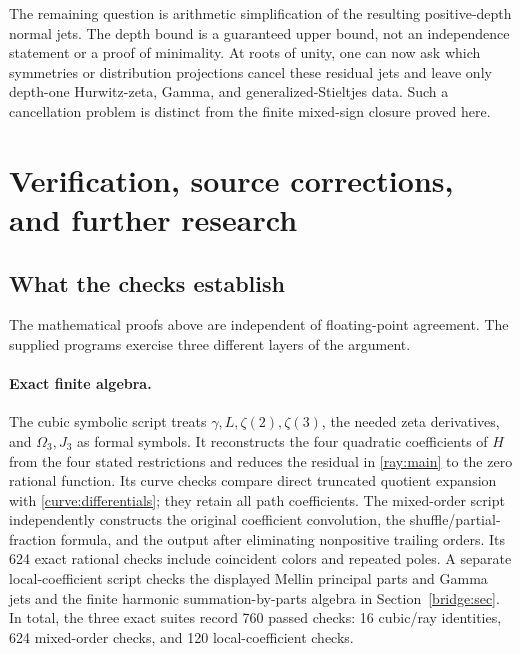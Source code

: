 \documentclass[11pt]{article}
\numberwithin{equation}{section}
\theoremstyle{definition}
\theoremstyle{remark}
\begin{document}
The remaining question is arithmetic simplification of the resulting
positive-depth normal jets.  The depth bound is a guaranteed upper
bound, not an independence statement or a proof of minimality.
At roots of unity, one can now ask which symmetries or distribution
projections cancel these residual jets and leave only depth-one
Hurwitz-zeta, Gamma, and generalized-Stieltjes data.  Such a
cancellation problem is distinct from the finite mixed-sign closure
proved here.


\section{Verification, source corrections, and further research}
\label{sec:audit}

\subsection{What the checks establish}

The mathematical proofs above are independent of floating-point
agreement. The supplied programs exercise three different layers of
the argument.

\paragraph{Exact finite algebra.}
The cubic symbolic script treats $\gamma,L,\zeta(2),\zeta(3)$,
the needed zeta derivatives, and $\Omega_3,J_3$ as formal symbols.
It reconstructs the four quadratic coefficients of $H$ from the
four stated restrictions and reduces the residual in
\eqref{ray:main} to the zero rational function. Its curve checks
compare direct truncated quotient expansion with
\eqref{curve:differentials}; they retain all path coefficients.
The mixed-order script independently constructs the original
coefficient convolution, the shuffle/partial-fraction formula, and
the output after eliminating nonpositive trailing orders. Its 624
exact rational checks include coincident colors and repeated poles.
A separate local-coefficient script checks the displayed Mellin
principal parts and Gamma jets and the finite harmonic
summation-by-parts algebra in Section~\ref{bridge:sec}. In total,
the three exact suites record 760 passed checks: 16 cubic/ray
identities, 624 mixed-order checks, and 120 local-coefficient checks.
\end{document}
